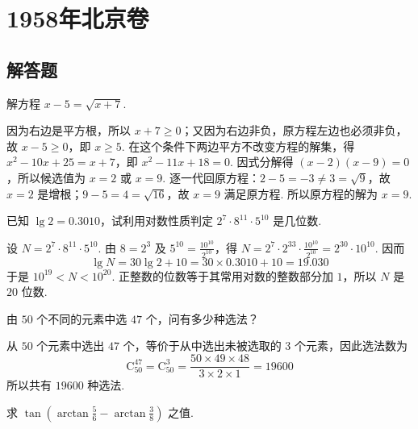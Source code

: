 \chapter{1958年北京卷}

\section{解答题}

\begin{problem}
解方程 \(x-5=\sqrt{x+7}\).
\end{problem}

\begin{solution}
因为右边是平方根，所以 \(x+7\geq 0\)；又因为右边非负，原方程左边也必须非负，故 \(x-5\geq 0\)，即 \(x\geq 5\). 在这个条件下两边平方不改变方程的解集，得 \(x^2-10x+25=x+7\)，即 \(x^2-11x+18=0\). 因式分解得 \(\left( x-2 \right)\left( x-9 \right)=0\)，所以候选值为 \(x=2\) 或 \(x=9\). 逐一代回原方程：\(2-5=-3\neq 3=\sqrt{9}\)，故 \(x=2\) 是增根；\(9-5=4=\sqrt{16}\)，故 \(x=9\) 满足原方程. 所以原方程的解为 \(x=9\).
\end{solution}

\begin{problem}
已知 \(\lg 2=0.3010\)，试利用对数性质判定 \(2^7\cdot 8^{11}\cdot 5^{10}\) 是几位数.
\end{problem}

\begin{solution}
设 \(N=2^7\cdot 8^{11}\cdot 5^{10}\). 由 \(8=2^3\) 及 \(5^{10}=\frac{10^{10}}{2^{10}}\)，得 \(N=2^7\cdot 2^{33}\cdot \frac{10^{10}}{2^{10}}=2^{30}\cdot 10^{10}\). 因而
\[
\lg N=30\lg 2+10=30\times 0.3010+10=19.030
\]
于是 \(10^{19}<N<10^{20}\). 正整数的位数等于其常用对数的整数部分加 \(1\)，所以 \(N\) 是 \(20\) 位数.
\end{solution}

\begin{problem}
由 \(50\) 个不同的元素中选 \(47\) 个，问有多少种选法？
\end{problem}

\begin{solution}
从 \(50\) 个元素中选出 \(47\) 个，等价于从中选出未被选取的 \(3\) 个元素，因此选法数为
\[
\mathrm C_{50}^{47}=\mathrm C_{50}^{3}=\frac{50\times 49\times 48}{3\times 2\times 1}=19600
\]
所以共有 \(19600\) 种选法.
\end{solution}

\begin{problem}
求 \(\tan\left( \arctan \frac{5}{6}-\arctan \frac{3}{8} \right)\) 之值.
\end{problem}

